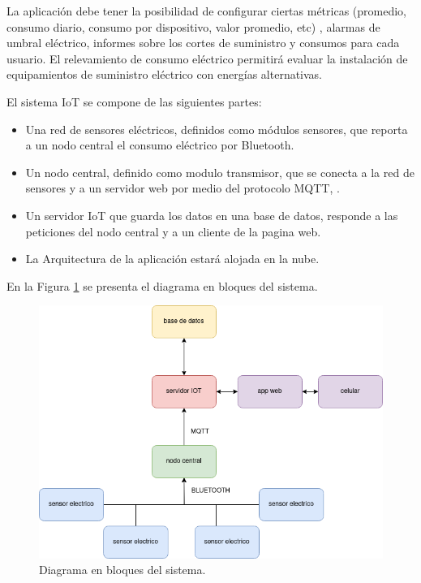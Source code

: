 \documentclass[
11pt, %
]{charter}
\begin{document}
La aplicación debe tener la posibilidad de configurar ciertas métricas (promedio,  consumo diario, consumo por dispositivo, valor promedio, etc) , alarmas de umbral eléctrico, informes sobre los cortes de suministro y consumos para cada usuario.
El relevamiento de consumo eléctrico permitirá evaluar la instalación de equipamientos de suministro eléctrico  con energías alternativas.


El sistema IoT se compone de las siguientes partes:

\begin{itemize}
\item{Una red de sensores eléctricos, definidos como módulos sensores, que reporta a un nodo central el consumo eléctrico por Bluetooth.
	}
\item{Un nodo central, definido como modulo transmisor, que se conecta a la red de sensores y a un servidor web por medio del protocolo MQTT, .
	}
\item{Un servidor IoT que guarda los datos en una base de datos, responde a las peticiones del nodo central y a un cliente de la pagina web.
	}
\item{La Arquitectura de la aplicación estará alojada en la nube.
	}
\end{itemize}




En la Figura \ref{fig:diagBloques} se presenta el diagrama en bloques del sistema. 

\begin{figure}[htpb]
\centering 
\includegraphics[width=.8\textwidth]{./Figuras/diagBloques.png}
\caption{Diagrama en bloques del sistema.}
\label{fig:diagBloques}
\end{figure}

\vspace{25px}
\end{document}
